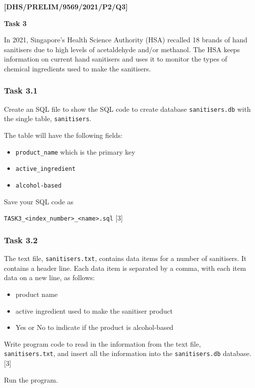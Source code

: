 \item \textbf{{[}DHS/PRELIM/9569/2021/P2/Q3{]} }

\textbf{Task 3} 

In 2021, Singapore's Health Science Authority (HSA) recalled 18 brands
of hand sanitisers due to high levels of acetaldehyde and/or methanol.
The HSA keeps information on current hand sanitisers and uses it to
monitor the types of chemical ingredients used to make the sanitisers. 

\subsubsection*{Task 3.1 }

Create an SQL file to show the SQL code to create database \texttt{sanitisers.db}
with the single table, \texttt{sanitisers}. 

The table will have the following fields: 
\begin{itemize}
\item \texttt{product\_name} which is the primary key 
\item \texttt{active\_ingredient} 
\item \texttt{alcohol-based} 
\end{itemize}
Save your SQL code as 

\texttt{TASK3\_<index\_number>\_<name>.sql} \hfill{}{[}3{]}

\subsubsection*{Task 3.2}

The text file, \texttt{sanitisers.txt}, contains data items for a
number of sanitisers. It contains a header line. Each data item is
separated by a comma, with each item data on a new line, as follows:
\begin{itemize}
\item product name 
\item active ingredient used to make the sanitiser product 
\item \textquotedbl Yes\textquotedbl{} or \textquotedbl No\textquotedbl{}
to indicate if the product is alcohol-based 
\end{itemize}
Write program code to read in the information from the text file,
\texttt{sanitisers.txt}, and insert all the information into the \texttt{sanitisers.db}
database. \hfill{}{[}3{]}

Run the program. 

